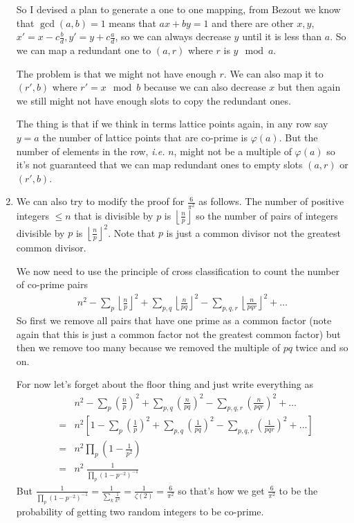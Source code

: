 \documentclass[aps,preprint,preprintnumbers,nofootinbib,showpacs,prd]{revtex4-1}
\newcommand{\ie}{{\it i.e.} }
\newcommand{\nbea}{\begin{eqnarray*}}
\newcommand{\neea}{\end{eqnarray*}}
\begin{document}
\begin{enumerate}
So I devised a plan to generate a one to one mapping, from Bezout we know that $\gcd(a,b) = 1$ means that $ax + by = 1$ and there are other $x,y$, $x' = x - c \frac{b}{d}, y' = y + c\frac{a}{d}$, so we can always decrease $y$ until it is less than $a$. So we can map a redundant one to $(a,r)$ where $r$ is $y \mod a$.

The problem is that we might not have enough $r$. We can also map it to $(r', b)$ where $r' = x \mod b$ because we can also decrease $x$ but then again we still might not have enough slots to copy the redundant ones.

The thing is that if we think in terms lattice points again, in any row say $y=a$ the number of lattice points that are co-prime is $\varphi(a)$. But the number of elements in the row, \ie $n$, might not be a multiple of $\varphi(a)$ so it's not guaranteed that we can map redundant ones to empty slots $(a,r)$ or $(r', b)$.
%
\item We can also try to modify the proof for $\frac{6}{\pi^2}$ as follows. The number of positive integers $\le n$ that is divisible by $p$ is $\left \lfloor \frac{n}{p}\right \rfloor$ so the number of pairs of integers divisible by $p$ is  $\left \lfloor \frac{n}{p}\right \rfloor^2$. Note that $p$ is just a common divisor not the greatest common divisor.

We now need to use the principle of cross classification to count the number of co-prime pairs 
%
\nbea
n^2 - \sum_p \left \lfloor \frac{n}{p}\right \rfloor^2 + \sum_{p,q} \left \lfloor \frac{n}{pq}\right \rfloor^2 - \sum_{p,q,r} \left \lfloor \frac{n}{pqr}\right \rfloor^2 + \dots
\neea
%
So first we remove all pairs that have one prime as a common factor (note again that this is just a common factor not the greatest common factor) but then we remove too many because we removed the multiple of $pq$ twice and so on.

For now let's forget about the floor thing and just write everything as
%
\nbea
&& n^2 - \sum_p \left ( \frac{n}{p}\right )^2 + \sum_{p,q} \left ( \frac{n}{pq}\right )^2 - \sum_{p,q,r} \left ( \frac{n}{pqr}\right )^2 + \dots \\
& = & n^2 \left \lbrack 1 - \sum_p \left ( \frac{1}{p}\right )^2 + \sum_{p,q} \left ( \frac{1}{pq}\right )^2 - \sum_{p,q,r} \left ( \frac{1}{pqr}\right )^2 + \dots \right \rbrack \\
& = & n^2 \prod_p \left ( 1- \frac{1}{p^2}\right ) \\
& = & n^2 ~ \frac{1}{\prod_p \left ( 1- p^{-2}\right )^{-1}} 
\neea
%
But $\frac{1}{\prod_p \left ( 1- p^{-2}\right )^{-1}} = \frac{1}{\sum_k \frac{1}{k^2}} = \frac{1}{\zeta(2)} = \frac{6}{\pi^2}$ so that's how we get $\frac{6}{\pi^2}$ to be the probability of getting two random integers to be co-prime.


\end{enumerate}
\end{document}
